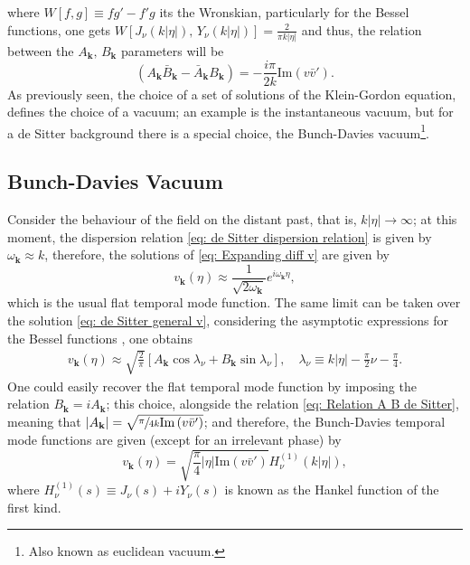 where $W[f,g]\equiv fg'-f'g$ its the Wronskian, particularly \cite[\href{https://dlmf.nist.gov/10.5}{10.5.2}]{DLMF} for the Bessel functions, one gets $W\left[J_\nu\left(k|\eta|\right),\,Y_\nu\left(k|\eta|\right)\right]=\frac{2}{\pi k|\eta|}$
and thus, the relation between the  $A_\mathbf{k},\,B_\mathbf{k}$ parameters will be
\begin{equation}\label{eq: Relation A B de Sitter}
	\left(A_\mathbf{k}\bar{B}_\mathbf{k}-\bar{A}_\mathbf{k}B_\mathbf{k}\right)=-\frac{i\pi}{2k}\text{Im}\left(v\bar{v}'\right).
\end{equation}
As previously seen, the choice of a set of solutions of the Klein-Gordon equation, defines the choice of a vacuum; an example is the instantaneous vacuum, but for a de Sitter background there is a special choice, the Bunch-Davies vacuum\footnote{Also known as euclidean vacuum.}.
\subsection{Bunch-Davies Vacuum}
Consider the behaviour of the field on the distant past, that is, $k|\eta|\to\infty$; at this moment, the dispersion relation \ref{eq: de Sitter dispersion relation} is given by $\omega_\mathbf{k}\approx k$, therefore, the solutions of \ref{eq: Expanding diff v} are given by
\begin{equation}
	v_\mathbf{k}(\eta)\approx \frac{1}{\sqrt{2\omega_\mathbf{k}}}e^{i\omega_\mathbf{k}\eta},
\end{equation}
which is the usual flat temporal mode function. The same limit can be taken over the solution \ref{eq: de Sitter general v}, 
considering the asymptotic expressions for the Bessel functions \cite[\href{https://dlmf.nist.gov/10.7}{10.7.8}]{DLMF}, one obtains
\begin{subequations}
	\begin{gather}
		v_\mathbf{k}(\eta)\approx \sqrt{\frac{2}{\pi}}\left[A_\mathbf{k}\cos\lambda_\nu+B_\mathbf{k}\sin\lambda_\nu\right],\quad \lambda_\nu\equiv k|\eta|-\frac{\pi}{2}\nu-\frac{\pi}{4}.\tag{\theequation \,\,a,b}
	\end{gather}
\end{subequations}
One could easily recover the flat temporal mode function by imposing the relation 
$B_\mathbf{k}=iA_\mathbf{k}$; this choice, alongside the relation \ref{eq: Relation A B de Sitter}, meaning that  $|A_\mathbf{k}|=\sqrt{\sfrac{\pi}{4 k}\text{Im}\left(v\bar{v}'\right)}$; and therefore, the Bunch-Davies temporal mode functions are given (except for an irrelevant phase) by
\begin{equation}
	v_\mathbf{k}(\eta)=\sqrt{\frac{\pi}{4 }|\eta|\text{Im}\left(v\bar{v}'\right)}H^{(1)}_\nu\left(k|\eta|\right),
\end{equation}
where $H^{(1)}_\nu(s)\equiv J_\nu(s)+iY_\nu(s)$ is known as the Hankel function of the first kind.

